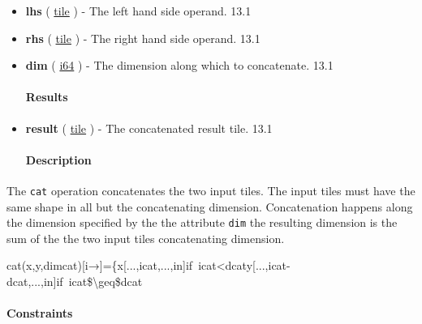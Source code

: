 \documentclass{article}
\begin{document}
\begin{itemize}
\item \textbf{lhs} ( \href{https://docs.nvidia.com/cuda/tile-ir/latest/sections/types.html#type-tile}{tile} ) - The left hand side operand. 13.1
\item \textbf{rhs} ( \href{https://docs.nvidia.com/cuda/tile-ir/latest/sections/types.html#type-tile}{tile} ) - The right hand side operand. 13.1
\item \textbf{dim} ( \href{https://docs.nvidia.com/cuda/tile-ir/latest/sections/types.html#subsection-element-types}{i64} ) - The dimension along which to concatenate. 13.1


\paragraph{Results}

\item \textbf{result} ( \href{https://docs.nvidia.com/cuda/tile-ir/latest/sections/types.html#type-tile}{tile} ) - The concatenated result tile. 13.1


\paragraph{Description}

\end{itemize}
The \texttt{cat} operation concatenates the two input tiles. The input tiles must have the same shape in all but the concatenating dimension. Concatenation happens along the dimension specified by the the attribute \texttt{dim} the resulting dimension is the sum of the the two input tiles concatenating dimension.


cat(x,y,dimcat)[i→]=\{x[...,icat,...,in]if icat<dcaty[...,icat-dcat,...,in]if icat\$\textbackslash{}geq\$dcat


\paragraph{Constraints}
\end{document}
